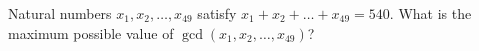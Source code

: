 Natural numbers $x_{1}, x_{2}, \ldots, x_{49}$ satisfy $x_{1}+x_{2}+\ldots+x_{49}=540$. What is the maximum possible value of $\gcd(x_{1}, x_{2}, \ldots, x_{49})$?
